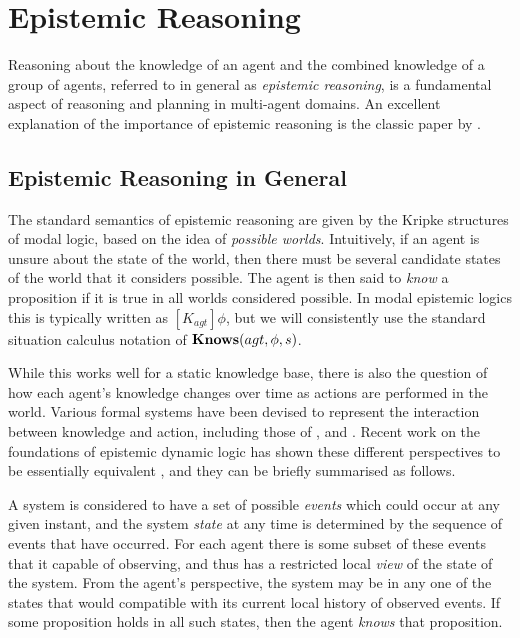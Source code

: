 \section{Epistemic Reasoning\label{sec:Background:Epistemic}}

Reasoning about the knowledge of an agent and the combined knowledge
of a group of agents, referred to in general as \emph{epistemic reasoning},
is a fundamental aspect of reasoning and planning in multi-agent domains.
An excellent explanation of the importance of epistemic reasoning
is the classic paper by \citet{halpern90knowledge_distrib}.


\subsection{Epistemic Reasoning in General}

The standard semantics of epistemic reasoning are given by the Kripke
structures of modal logic, based on the idea of \emph{possible worlds}.
Intuitively, if an agent is unsure about the state of the world, then
there must be several candidate states of the world that it considers
possible. The agent is then said to \emph{know} a proposition if it
is true in all worlds considered possible. In modal epistemic logics
this is typically written as $[K_{agt}]\phi$, but we will consistently
use the standard situation calculus notation of $\mathbf{Knows}(agt,\phi,s)$.

While this works well for a static knowledge base, there is also the
question of how each agent's knowledge changes over time as actions
are performed in the world. Various formal systems have been devised
to represent the interaction between knowledge and action, including
those of \citet{fagin95}, \citet{parikh85dist_knowledge} and \citet{baltag98pa_ck}.
Recent work on the foundations of epistemic dynamic logic has shown
these different perspectives to be essentially equivalent \citep{vanBentham06tree_of_knowledge,pacuit07history_structures},
and they can be briefly summarised as follows.

A system is considered to have a set of possible \emph{events} which
could occur at any given instant, and the system \emph{state} at any
time is determined by the sequence of events that have occurred. For
each agent there is some subset of these events that it capable of
observing, and thus has a restricted local \emph{view} of the state
of the system. From the agent's perspective, the system may be in
any one of the states that would compatible with its current local
history of observed events. If some proposition holds in all such
states, then the agent \emph{knows} that proposition.

